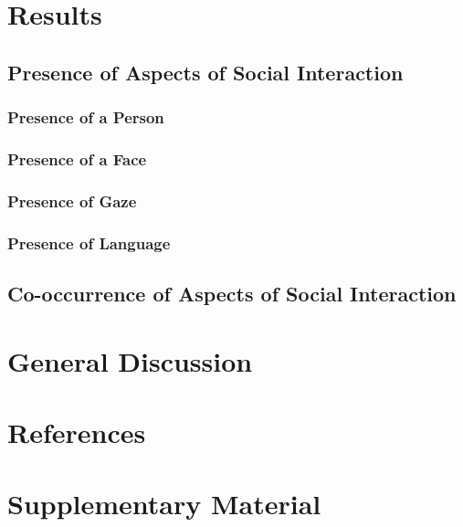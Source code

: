 \documentclass[
  man,floatsintext]{apa6}
\begin{document}
\section{Results}\label{results}

\subsection{Presence of Aspects of Social Interaction}\label{presence-of-aspects-of-social-interaction}

\subsubsection{Presence of a Person}\label{presence-of-a-person}

\subsubsection{Presence of a Face}\label{presence-of-a-face}

\subsubsection{Presence of Gaze}\label{presence-of-gaze}

\subsubsection{Presence of Language}\label{presence-of-language}

\subsection{Co-occurrence of Aspects of Social Interaction}\label{co-occurrence-of-aspects-of-social-interaction}

\section{General Discussion}\label{general-discussion}

\newpage

\section{References}\label{references}

\newpage

\section{Supplementary Material}\label{supplementary-material}
\end{document}
